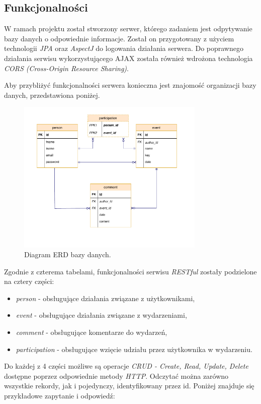 \documentclass[12pt]{article}
\begin{document}
\subsection{Funkcjonalności}
W ramach projektu został stworzony serwer, którego zadaniem jest odpytywanie bazy danych o odpowiednie informacje. Został on przygotowany z użyciem technologii \textit{JPA} oraz \textit{AspectJ} do logowania działania serwera. Do poprawnego działania serwisu wykorzystującego AJAX została również wdrożona technologia \textit{CORS (Cross-Origin Resource Sharing)}.

Aby przybliżyć funkcjonalności serwera konieczna jest znajomość organizacji bazy danych, przedstawiona poniżej.

\begin{figure}[H]
\centering
\includegraphics[width=0.8\textwidth]{erd.pdf}
\caption{Diagram ERD bazy danych.}
\end{figure}

Zgodnie z czterema tabelami, funkcjonalności serwisu \textit{RESTful} zostały podzielone na cztery części: 
\begin{itemize}
\item \textit{person} - obsługujące działania związane z użytkownikami, 
\item \textit{event} - obsługujące działania związane z wydarzeniami, 
\item \textit{comment} - obsługujące komentarze do wydarzeń,
\item \textit{participation} - obsługujące wzięcie udziału przez użytkownika w wydarzeniu.
\end{itemize}

Do każdej z 4 części możliwe są operacje \textit{CRUD - Create, Read, Update, Delete} dostępne poprzez odpowiednie metody \textit{HTTP}. Odczytać można zarówno wszystkie rekordy, jak i pojedynczy, identyfikowany przez id. Poniżej znajduje się przykładowe zapytanie i odpowiedź:
\end{document}
